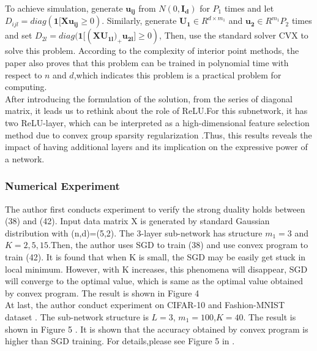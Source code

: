 \documentclass{article}
\begin{document}
To achieve simulation, generate $\mathbf{u_{ij}}$ from $N(0,\mathbf{I_d})$ for $P_1$ times and let $D_{ijl}=diag(\textbf{1}[\mathbf{Xu_{ij}}\geq 0)$. Similarly, generate $\mathbf{U_1}\in R^{d\times m_1}$ and $\mathbf{u_2} \in R^{m_1} P_2$ times and set $D_{2l}=diag(\textbf{1}[(\mathbf{XU_{1l})_+u_{2l}}]\geq 0)$, Then, use the standard solver CVX to solve this problem. According to the complexity of interior point methods, the paper \cite{deeprelu} also proves that this problem can be trained in polynomial time with respect to $n$ and $d$,which indicates this problem is a practical problem for computing. \\
After introducing the formulation of the solution, from the series of diagonal matrix, it leads us to rethink about the role of ReLU.For this subnetwork, it has two ReLU-layer, which can be interpreted as a high-dimensional feature selection method due to convex group sparsity regularization \cite{deeprelu}.Thus, this results reveals the impact of having additional layers and its implication on the expressive power of a network. \\
\subsubsection{Numerical Experiment}
The author first conducts experiment to verify the strong duality holds between (38) and (42). Input data matrix X is generated by standard Gaussian distribution with (n,d)=(5,2). The 3-layer sub-network has structure $m_1=3$ and $K=2,5,15$.Then, the author uses SGD to train (38) and use convex program to train (42). It is found that when K is small, the SGD may be easily get stuck in local minimum. However, with K increases, this phenomena will disappear, SGD will converge to the optimal value, which is same as the optimal value obtained by convex program. The result is shown in Figure 4 \cite{deeprelu}\\
At last, the author conduct experiment on CIFAR-10\cite{CIFAR} and Fashion-MNIST dataset \cite{xiao2017/online}. The sub-network structure is $L=3$, $m_1=100$,$K=40$. The result is shown in Figure 5 \cite{deeprelu}.
It is shown that the accuracy obtained by convex program is higher than SGD training. For details,please see Figure 5 in \cite{deeprelu}. 
\end{document}
